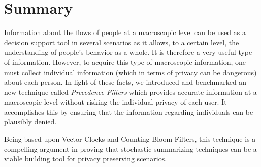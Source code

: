 \section{Summary}
\label{sec:ct-summary}

Information about the flows of people at a macroscopic level can be used as
a decision support tool in several scenarios as it allows, to a
certain level, the understanding of people's behavior as a whole.  It
is therefore a very useful type of information.  However, to acquire
this type of macroscopic  information, one must collect individual
information (which in terms of privacy can be dangerous) about each
person. In light of these facts, we introduced and benchmarked an new
technique called \emph{Precedence Filters} which provides accurate
information at a macroscopic level without risking the individual
privacy of each user. It accomplishes this by ensuring that the
information regarding individuals can be plausibly denied.

Being based upon Vector Clocks and Counting Bloom Filters, this
technique is a compelling argument in proving that stochastic
summarizing techniques can be a viable building tool for privacy
preserving scenarios.



